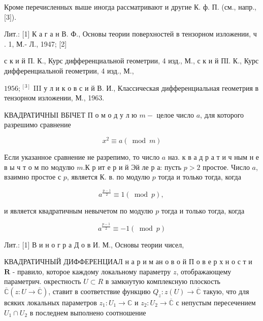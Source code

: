 \documentclass[10pt]{article}
\begin{document}
Кроме перечисленных выше иногда рассматривают и другие К. ф. П. (см., напр., [3]).



Лит.: [1] К а г а н В. Ф., Основы теории поверхностей в тензорном изложении, ч . 1, М.- Л., 1947; [2]

с к и й П. К., Курс дифференциальной геометрии, 4 изд., М., с к и й ПI. К., Курс дифференциальной геометрии, 4 изд., М.,

$1956 ;{ }^{[3]}$ III у л и к о в с и й В. И., Классическая дифференциальная геометрия в тензорном изложении, М., 1963.



КВАДРАТИЧНЫІ ВБІЧЕТ П о м о д у л ю $m-$ целое число $a$, для которого разрешимо сравнение



\[

x^{2} \equiv a(\bmod m)

\]



Если указанное сравнение не разрепимо, то число $a$ наз. к в а д р а т и ч ным н е в ы ч т о м по модулю $m . К$ р ит е р и й Эй ле р а: пусть $p>2$ простое. Число $a$, взаимно простое с $p$, является $К$. в. по модулю $p$ тогда и только тогда, когда



\[

a^{\frac{p-1}{2}} \equiv 1(\bmod p) \text {, }

\]



и является квадратичным невычетом по модулю $p$ тогда и только тогда, когда



\[

a^{\frac{p-1}{2}} \equiv-1(\bmod p)

\]



Лит.: [1] В и н о г р а Д о в И. М., Основы теории чисел,



КВАДРАТИЧНЫЙ ДИФФЕРЕНЦИАЛ н а р и м ан о в о й П о в е р х н о с т и $\boldsymbol{R}$ - правило, которое каждому локальному параметру $z$, отображающему параметрич. окрестность $U \subset R$ в замкнутую комплексную плоскость $\overline{\mathbb{C}}(z: U \rightarrow \overline{\mathbb{C}})$, ставит в соответствие функцию $Q_{z}: z(U) \rightarrow \overline{\mathbb{C}}$ такую, что для всяких локальных параметров $z_{1}: U_{1} \rightarrow \mathbb{C}$ и $z_{2}: U_{2} \rightarrow \overline{\mathbb{C}}$ с непустым пересечением $U_{1} \cap U_{2}$ в последнем выполнено соотношение
\end{document}
